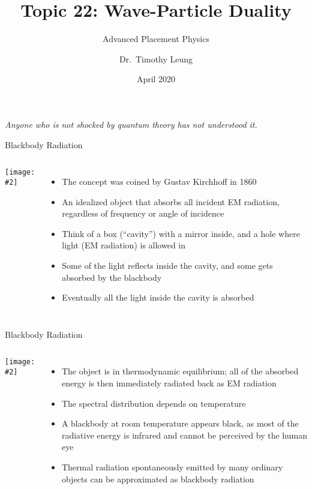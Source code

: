 \documentclass[12pt,compress,aspectratio=169]{beamer}
\title[Quantum]{Topic 22: Wave-Particle Duality}
\subtitle{Advanced Placement Physics}
\author[TML]{Dr.\ Timothy Leung}
\institute{Olympiads School\\Toronto, Ontario, Canada}
\date{April 2020}
\newcommand{\pic}[2]{\texttt{[image: \#2]}}
\begin{document}
\begin{frame}
  \maketitle
\end{frame}


\begin{frame}{}
  \begin{center}
    \emph{Anyone who is not shocked by quantum theory has not understood it.}

    \vspace{.2in}
    \hspace{4in}{- Niels Bohr}
  \end{center}
\end{frame}



\begin{frame}{Blackbody Radiation}
  \begin{columns}
    \pic{1.3}{Black-body_realization.png}
     
    \begin{itemize}
    \item The concept was coined by Gustav Kirchhoff in 1860
    \item An idealized object that absorbs all incident EM radiation,
      regardless of frequency or angle of incidence
    \item Think of a box (``cavity'') with a mirror inside, and a hole where
      light (EM radiation) is allowed in
    \item Some of the light reflects inside the cavity, and some gets absorbed
      by the blackbody
    \item Eventually all the light inside the cavity is absorbed
    \end{itemize}
    \end{columns}
\end{frame}


\begin{frame}{Blackbody Radiation}
  \begin{columns}
    \pic{1.3}{Black-body_realization.png}
    
    \begin{itemize}
    \item The object is in thermodynamic equilibrium; all of the absorbed
      energy is then immediately radiated back as EM radiation
    \item The spectral distribution depends on temperature
    \item A blackbody at room temperature appears black, as most of the
      radiative energy is infrared and cannot be perceived by the human eye
    \item Thermal radiation spontaneously emitted by many ordinary objects can
      be approximated as blackbody radiation 
    \end{itemize}
  \end{columns}
\end{frame}
\end{document}
